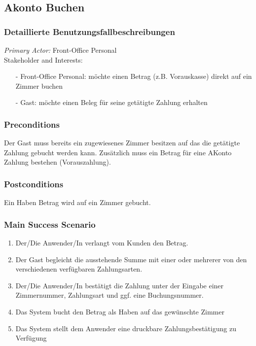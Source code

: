 \documentclass[./detailed_overview_usecases.tex]{subfiles}
\begin{document}
    \subsection{Akonto Buchen}
    \subsubsection{Detaillierte Benutzungsfallbeschreibungen}
    \textit{Primary Actor:}
    Front-Office Personal
    \\
    Stakeholder and Interests:
    \begin{itemize}
        \item[-] Front-Office Personal: möchte einen Betrag (z.B. Vorauskasse) direkt auf ein Zimmer buchen
        \item[-] Gast: möchte einen Beleg für seine getätigte Zahlung erhalten
    \end{itemize}

    \subsubsection*{Preconditions}
    Der Gast muss bereits ein zugewiesenes Zimmer besitzen auf das die getätigte Zahlung gebucht werden kann.
    Zusätzlich muss ein Betrag für eine AKonto Zahlung bestehen (Vorauszahlung).

    \subsubsection*{Postconditions}
    Ein Haben Betrag wird auf ein Zimmer gebucht.

    \subsubsection*{Main Success Scenario}
    \begin{enumerate}
        \item Der/Die Anwender/In verlangt vom Kunden den Betrag.
        \item Der Gast begleicht die ausstehende Summe mit einer oder mehrerer von den verschiedenen verfügbaren Zahlungsarten.
        \item Der/Die Anwender/In bestätigt die Zahlung unter der Eingabe einer
        Zimmernummer, Zahlungsart und ggf. eine Buchungsnummer.
        \item Das System bucht den Betrag als Haben auf das gewünschte Zimmer
        \item Das System stellt dem Anwender eine druckbare Zahlungsbestätigung zu Verfügung
    \end{enumerate}
\end{document}
